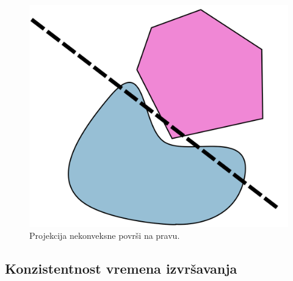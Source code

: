 \documentclass[a4paper]{article}
\begin{document}
{\begin{figure}[h!]
	\begin{center}
	\includegraphics[scale=0.15]{theorem_counterexample.png}
	\end{center}
	\caption{Projekcija nekonveksne površi na pravu.}
	\label{fig:counter}
\end{figure}

\subsection{Konzistentnost vremena izvršavanja}

}
\end{document}
